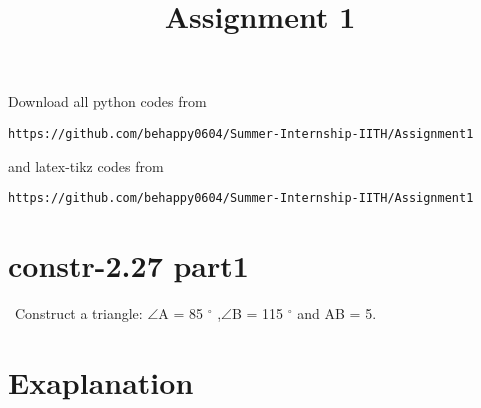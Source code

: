 \documentclass[journal,12pt,twocolumn]{IEEEtran}
\begin{document}
     \def\rightbox#1{\makebox[0in][r]{#1}}
     \def\centbox#1{\makebox[0in]{#1}}
     \def\topbox#1{\raisebox{-\baselineskip}[0in][0in]{#1}}
     \def\midbox#1{\raisebox{-0.5\baselineskip}[0in][0in]{#1}}
\vspace{3cm}
\title{Assignment 1}
\maketitle
\newpage
\bigskip
\renewcommand{\thefigure}{\theenumi}
\renewcommand{\thetable}{\theenumi}
Download all python codes from 
\begin{lstlisting}
https://github.com/behappy0604/Summer-Internship-IITH/Assignment1
\end{lstlisting}
%
and latex-tikz codes from 
%
\begin{lstlisting}
https://github.com/behappy0604/Summer-Internship-IITH/Assignment1
\end{lstlisting}
%
\section{constr-2.27 part1}
\ Construct a triangle: $\angle$A = 85 $^{\circ}$ ,$\angle$B = 115 $^{\circ}$ and AB = 5.

\section{Exaplanation}
%
\end{document}
